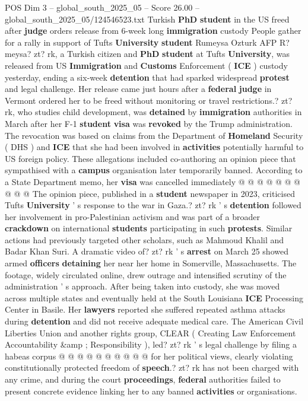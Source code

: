 \begin{textsample}{POS Dim 3 – global\_south\_2025\_05 – Score 26.00 – global\_south\_2025\_05/124546523.txt}  \label{ex:f3_pos_229}
Turkish \textbf{PhD} \textbf{student} in the US freed after \textbf{judge} orders release from 6-week long \textbf{immigration} custody People gather for a rally in support of Tufts \textbf{University} \textbf{student} Rumeysa Ozturk AFP R? meysa? zt? rk, a Turkish citizen and \textbf{PhD} \textbf{student} at Tufts \textbf{University}, was released from US \textbf{Immigration} and \textbf{Customs} Enforcement ( \textbf{ICE} ) custody yesterday, ending a six-week \textbf{detention} that had sparked widespread \textbf{protest} and legal challenge.
Her release came just hours after a \textbf{federal} \textbf{judge} in Vermont ordered her to be freed without monitoring or travel restrictions.? zt? rk, who studies child development, was \textbf{detained} by \textbf{immigration} authorities in March after her F-1 \textbf{student} \textbf{visa} was \textbf{revoked} by the Trump administration.
The revocation was based on claims from the Department of \textbf{Homeland} Security ( DHS ) and \textbf{ICE} that she had been involved in \textbf{activities} potentially harmful to US foreign policy.
These allegations included co-authoring an opinion piece that sympathised with a \textbf{campus} organisation later temporarily banned.
According to a State Department memo, her \textbf{visa} was cancelled immediately @ @ @ @ @ @ @ @ @ @ The opinion piece, published in a \textbf{student} newspaper in 2023, criticised Tufts \textbf{University} ' s response to the war in Gaza.? zt? rk ' s \textbf{detention} followed her involvement in pro-Palestinian activism and was part of a broader \textbf{crackdown} on international \textbf{students} participating in such \textbf{protests}.
Similar actions had previously targeted other scholars, such as Mahmoud Khalil and Badar Khan Suri.
A dramatic video of? zt? rk ' s \textbf{arrest} on March 25 showed armed \textbf{officers} \textbf{detaining} her near her home in Somerville, Massachusetts.
The footage, widely circulated online, drew outrage and intensified scrutiny of the administration ' s approach.
After being taken into custody, she was moved across multiple states and eventually held at the South Louisiana \textbf{ICE} Processing Center in Basile.
Her \textbf{lawyers} reported she suffered repeated asthma attacks during \textbf{detention} and did not receive adequate medical care.
The American Civil Liberties Union and another rights group, CLEAR ( Creating Law Enforcement Accountability \&amp ; Responsibility ), led? zt? rk ' s legal challenge by filing a habeas corpus @ @ @ @ @ @ @ @ @ @ for her political views, clearly violating constitutionally protected freedom of \textbf{speech}.? zt? rk has not been charged with any crime, and during the court \textbf{proceedings}, \textbf{federal} authorities failed to present concrete evidence linking her to any banned \textbf{activities} or organisations.

\end{textsample}
